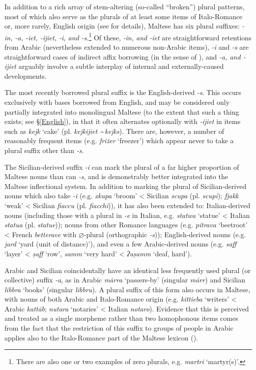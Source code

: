 \documentclass[output=paper]{langsci/langscibook}
\begin{document}
In addition to a rich array of stem-altering (so-called ``broken'') plural patterns, most of which also serve as the plurals of at least some items of Italo-Romance or, more rarely, English origin (see \citealt{spagnol2011} for details), Maltese has six plural suffixes: \textit{-in, -a, -iet, -ijiet, -i, \textnormal{and} -s}.\footnote{There are also one or two examples of zero plurals, e.g. \textit{martri} `martyr(s)'.} Of these, \textit{-in, \textnormal{and} -iet} are straightforward retentions from Arabic (nevertheless extended to numerous non-Arabic items), \textit{-i} and \textit{-s} are straightforward cases of indirect affix borrowing (in the sense of \citealt{Seifart2015}), and \textit{-a, \textnormal{and} -ijiet} arguably involve a subtle interplay of internal and externally-caused developments.

The most recently borrowed plural suffix is the English-derived \textit{-s}. This occurs exclusively with bases borrowed from English, and may be considered only partially integrated into monolingual Maltese (to the extent that such a thing exists; see §\ref{English}), in that it often alternates optionally with \textit{-ijiet} in items such as \textit{kejk} `cake' (pl. \textit{kejkijiet \textasciitilde \,kejks}). There are, however, a number of reasonably frequent items (e.g. \textit{friżer} `freezer') which appear never to take a plural suffix other than \textit{-s}.

The Sicilian-derived suffix \textit{-i} can mark the plural of a far higher proportion of Maltese nouns than can \textit{-s}, and is demonstrably better integrated into the Maltese inflectional system. In addition to marking the plural of Sicilian-derived nouns which also take \textit{-i} (e.g. \textit{xkupa} `broom' < Sicilian \textit{scupa} (pl. \textit{scupi}); \textit{fjakk} `weak' < Sicilian \textit{fiaccu} (pl. \textit{fiacchi})), it has also been extended to: Italian-derived nouns (including those with a plural in \textit{-e} in Italian, e.g. \textit{statwa} `statue' < Italian \textit{statua} (pl. \textit{statue})); nouns from other Romance languages (e.g. \textit{pitrava} `beetroot' < French \textit{betterave} with $\varnothing$-plural (orthographic \textit{-s})); English-derived nouns (e.g. \textit{jard} `yard (unit of distance)'), and even a few Arabic-derived nouns (e.g. \textit{saff} `layer' < \textit{\d{s}aff} `row', \textit{samm} `very hard' < \textit{ʔa\d{s}amm} `deaf, hard'). 

Arabic and Sicilian coincidentally have an identical less frequently used plural (or collective) suffix \textit{-a}, as in Arabic \textit{m\={a}rra} `passers-by' (singular \textit{m\={a}rr}) and Sicilian \textit{libbra} `books' (singular \textit{libbru}). A plural suffix of this form also occurs in Maltese, with nouns of both Arabic and Italo-Romance origin (e.g. \textit{kittieba} `writers' < Arabic \textit{katt\={a}b}; \textit{nutara} `notaries' < Italian \textit{notaro}). Evidence that this is perceived and treated as a single morpheme rather than two homophonous items comes from the fact that the restriction of this suffix to groups of people in Arabic applies also to the Italo-Romance part of the Maltese lexicon (\citealt{mifsud2011}). 
\end{document}
